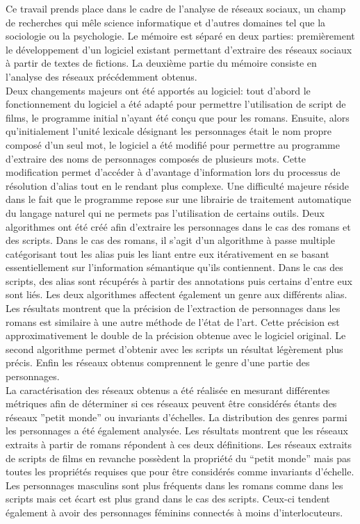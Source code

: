 \documentclass[a4paper, 12pt]{report}
\begin{document}
Ce travail prends place dans le cadre de l'analyse de réseaux sociaux, un champ de recherches qui mêle science informatique et d'autres domaines tel que la sociologie ou la psychologie.
Le mémoire est séparé en deux parties: premièrement le développement d'un logiciel existant permettant d'extraire des réseaux sociaux à partir de textes de fictions.  La deuxième partie du mémoire consiste en l'analyse des réseaux précédemment obtenus.\\

Deux changements majeurs ont été apportés au logiciel: tout d'abord le fonctionnement du logiciel a été adapté pour permettre l'utilisation de script de films, le programme initial n'ayant été conçu que pour les romans. Ensuite, alors qu'initialement l'unité lexicale désignant les personnages était le nom propre composé d'un seul mot, le logiciel a été modifié pour permettre au programme d'extraire des noms de personnages composés de plusieurs mots. Cette modification permet d'accéder à d'avantage d'information lors du processus de résolution d'alias tout en le rendant plus complexe. Une difficulté majeure réside dans le fait que le programme repose sur une librairie de traitement automatique du langage naturel qui ne permets pas l'utilisation de certains outils. Deux algorithmes ont été créé afin d'extraire les personnages dans le cas des romans et des scripts. Dans le cas des romans, il s'agit d'un algorithme à passe multiple catégorisant tout les alias puis les liant entre eux itérativement en se basant essentiellement sur l'information sémantique qu'ils contiennent. Dans le cas des scripts, des alias sont récupérés à partir des annotations puis certains d'entre eux sont liés. Les deux algorithmes affectent également un genre aux différents alias. Les résultats montrent que la précision de l'extraction de personnages dans les romans est similaire à une autre méthode de l'état de l'art. Cette précision est approximativement le double de la précision obtenue avec le logiciel original. Le second algorithme permet d'obtenir avec les scripts un résultat légèrement plus précis. Enfin les réseaux obtenus comprennent le genre d'une partie des personnages.\\


La caractérisation des réseaux obtenus a été réalisée en mesurant différentes métriques afin de déterminer si ces réseaux peuvent être considérés étants des réseaux ''petit monde'' ou invariants d'échelles. La distribution des genres parmi les personnages a été également analysée. Les résultats montrent que les réseaux extraits à partir de romans répondent à ces deux définitions. Les réseaux extraits de scripts de films en revanche possèdent la propriété du ``petit monde'' mais pas toutes les propriétés requises que pour être considérés comme invariants d'échelle. Les personnages masculins sont plus fréquents dans les romans comme dans les scripts mais cet écart est plus grand dans le cas des scripts. Ceux-ci tendent également à avoir des personnages féminins connectés à moins d'interlocuteurs.
\end{document}
